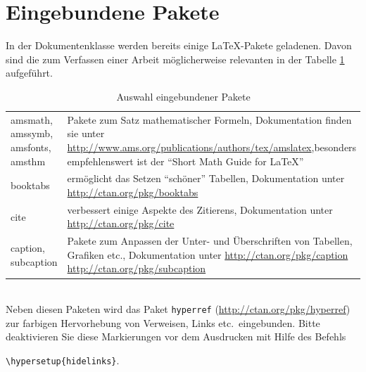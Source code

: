 \section{Eingebundene Pakete}
In der Dokumentenklasse werden bereits einige \LaTeX-Pakete geladenen. Davon sind die zum Verfassen einer Arbeit möglicherweise relevanten in der Tabelle \ref{tab:pakete} aufgeführt. 
\begin{table}[htbp]%
\centering
\caption{Auswahl eingebundener Pakete}
\label{tab:pakete}
\begin{tabular}{p{3.6cm}p{11.4cm}}
amsmath, amssymb, \newline amsfonts, amsthm & Pakete zum Satz mathematischer Formeln, Dokumentation finden sie unter \newline\url{http://www.ams.org/publications/authors/tex/amslatex},\newline besonders empfehlenswert ist der "`Short Math Guide for \LaTeX"'\\
booktabs & ermöglicht das Setzen "`schöner"' Tabellen, Dokumentation unter \url{http://ctan.org/pkg/booktabs}\\
cite & verbessert einige Aspekte des Zitierens, Dokumentation unter \newline\url{http://ctan.org/pkg/cite}\\
caption, subcaption & Pakete zum Anpassen der Unter- und Überschriften von Tabellen, Grafiken etc., Dokumentation unter \newline\url{http://ctan.org/pkg/caption} \newline\url{http://ctan.org/pkg/subcaption}
\end{tabular}
\end{table}\\
Neben diesen Paketen wird das Paket \verb|hyperref| (\url{http://ctan.org/pkg/hyperref}) zur farbigen Hervorhebung von Verweisen, Links etc.\ eingebunden. Bitte deaktivieren Sie diese Markierungen vor dem Ausdrucken mit Hilfe des Befehls
\begin{center}
\verb|\hypersetup{hidelinks}|.
\end{center}



